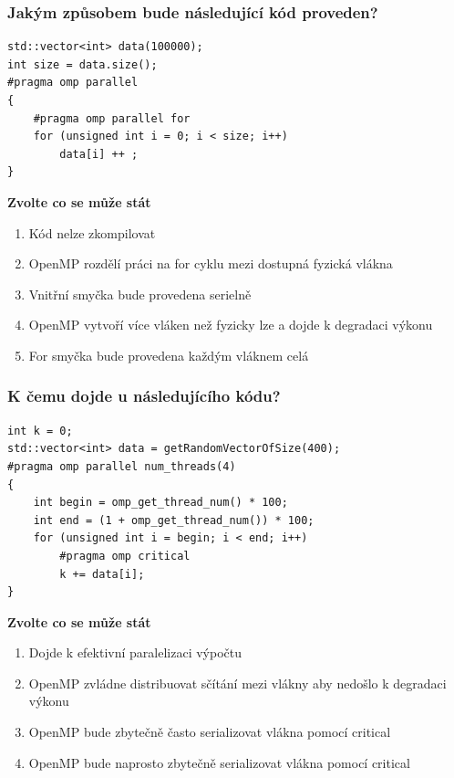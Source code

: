 \documentclass[usenames,dvipsnames,9pt]{beamer}
\begin{document}
\begin{frame}[fragile]
  \frametitle{Jakým způsobem bude následující kód proveden?}

\begin{verbatim}
std::vector<int> data(100000);
int size = data.size();
#pragma omp parallel
{
	#pragma omp parallel for
	for (unsigned int i = 0; i < size; i++)
		data[i] ++ ;
}
\end{verbatim}
  
  \vspace{2em}
  
  {\bf Zvolte co se může stát}
  
  \begin{enumerate}
  \item Kód nelze zkompilovat
   \item OpenMP rozdělí práci na for cyklu mezi dostupná fyzická vlákna
    \item Vnitřní smyčka bude provedena serielně
     \item OpenMP vytvoří více vláken než fyzicky lze a dojde k degradaci výkonu
     \item For smyčka bude provedena každým vláknem celá
  \end{enumerate}

\end{frame}

\begin{frame}[fragile]
  \frametitle{K čemu dojde u následujícího kódu?}

\begin{verbatim}
int k = 0;
std::vector<int> data = getRandomVectorOfSize(400);
#pragma omp parallel num_threads(4)
{
	int begin = omp_get_thread_num() * 100;
	int end = (1 + omp_get_thread_num()) * 100;
	for (unsigned int i = begin; i < end; i++)
		#pragma omp critical
		k += data[i];
}
\end{verbatim}
  
  \vspace{2em}
  
  {\bf Zvolte co se může stát}
  
  \begin{enumerate}
  \item Dojde k efektivní paralelizaci výpočtu
  \item OpenMP zvládne distribuovat sčítání mezi vlákny aby nedošlo k degradaci výkonu
  \item OpenMP bude zbytečně často serializovat vlákna pomocí critical
  \item OpenMP bude naprosto zbytečně serializovat vlákna pomocí critical
  \end{enumerate}

\end{frame}
\end{document}
